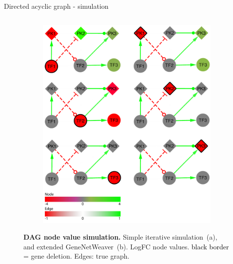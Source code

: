 \begin{frame}{Directed acyclic graph - simulation}
\begin{columns}
\begin{column}{0.8\textwidth}
\begin{figure}[ht]
\begin{subfigure}[b]{0.44\textwidth}
\includegraphics[width=\textwidth]{analysis/fig/gnw.pdf}
\end{subfigure}
\caption{\textbf{DAG node value simulation.} Simple iterative simulation~(a), and extended GeneNetWeaver~(b). LogFC node values. \textcolor{black}{black border} = gene deletion. Edges: true graph. }
\label{fig:dag_data}
\end{figure}




\end{column}
\end{columns}
\end{frame}

